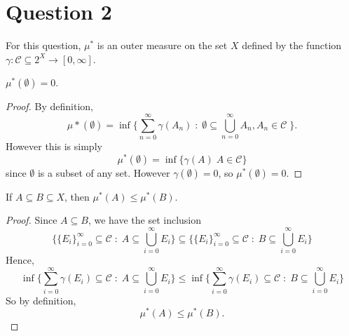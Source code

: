 \documentclass{unswmaths}
\begin{document}
\section*{Question 2}
For this question, $\mu^*$ is an outer measure on the set $X$ defined by the function $\gamma:\mathcal{C}\subseteq 2^X\rightarrow[0,\infty]$.
\begin{lemma}
    $\mu^*(\emptyset) = 0$.
\end{lemma}
\begin{proof}
    By definition,
    \begin{equation*}
        \mu*(\emptyset) = \inf\{\sum_{n=0}^\infty \gamma(A_n) \;:\; \emptyset \subseteq \bigcup_{n=0}^\infty A_n,A_n \in \mathcal{C}\;\}.
    \end{equation*}
    However this is simply
    \begin{equation*}
        \mu^*(\emptyset) = \inf\{\gamma(A)\;A \in \mathcal{C}\}
    \end{equation*}
    since $\emptyset$ is a subset of any set. However $\gamma(\emptyset) = 0$,
    so $\mu^*(\emptyset) = 0$.
\end{proof}

\begin{lemma}
    If $A \subseteq B \subseteq X$, then $\mu^*(A) \leq \mu^*(B)$.
\end{lemma}
\begin{proof}
    Since $A \subseteq B$, we have the set inclusion
    \begin{equation*}
        \{\{E_i\}_{i=0}^\infty \subseteq \mathcal{C}\;:\;A \subseteq \bigcup_{i=0}^\infty E_i\} \subseteq \{\{E_i\}_{i=0}^\infty \subseteq \mathcal{C}\;:\;B \subseteq \bigcup_{i=0}^\infty E_i\}
    \end{equation*}
    Hence,
    \begin{equation*}
        \inf\{\sum_{i=0}^\infty \gamma(E_i) \subseteq \mathcal{C}\;:\;A \subseteq \bigcup_{i=0}^\infty E_i\} \leq \inf\{\sum_{i=0}^\infty \gamma(E_i) \subseteq \mathcal{C}\;:\;B \subseteq \bigcup_{i=0}^\infty E_i\}
    \end{equation*}
    So by definition,
    \begin{equation*}
        \mu^*(A)\leq\mu^*(B).
    \end{equation*}
\end{proof}
\end{document}
